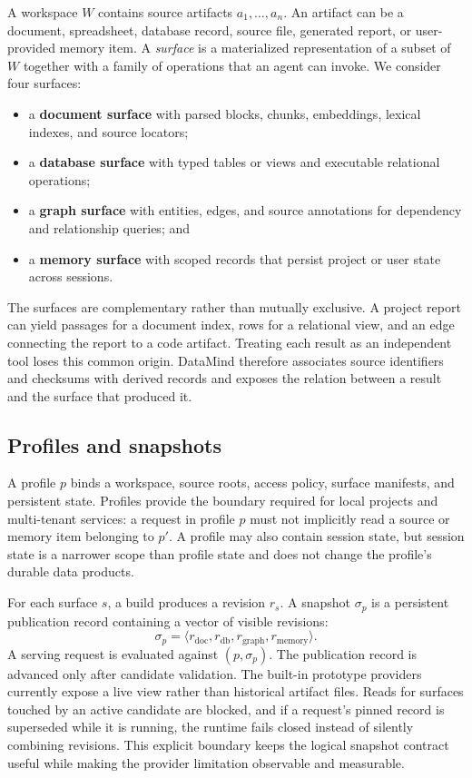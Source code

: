 A workspace $W$ contains source artifacts $a_1,\ldots,a_n$. An artifact can be
a document, spreadsheet, database record, source file, generated report, or
user-provided memory item. A \emph{surface} is a materialized representation
of a subset of $W$ together with a family of operations that an agent can
invoke. We consider four surfaces:
\begin{itemize}
  \item a \textbf{document surface} with parsed blocks, chunks, embeddings,
  lexical indexes, and source locators;
  \item a \textbf{database surface} with typed tables or views and executable
  relational operations;
  \item a \textbf{graph surface} with entities, edges, and source annotations
  for dependency and relationship queries; and
  \item a \textbf{memory surface} with scoped records that persist project or
  user state across sessions.
\end{itemize}

The surfaces are complementary rather than mutually exclusive. A project
report can yield passages for a document index, rows for a relational view,
and an edge connecting the report to a code artifact. Treating each result as
an independent tool loses this common origin. DataMind therefore associates
source identifiers and checksums with derived records and exposes the relation
between a result and the surface that produced it.

\subsection{Profiles and snapshots}
\label{sec:profile-snapshot}

A profile $p$ binds a workspace, source roots, access policy, surface
manifests, and persistent state. Profiles provide the boundary required for
local projects and multi-tenant services: a request in profile $p$ must not
implicitly read a source or memory item belonging to $p'$. A profile may also
contain session state, but session state is a narrower scope than profile state
and does not change the profile's durable data products.

For each surface $s$, a build produces a revision $r_s$. A snapshot $\sigma_p$
is a persistent publication record containing a vector of visible revisions:
\[
  \sigma_p = \langle r_{\mathrm{doc}}, r_{\mathrm{db}},
  r_{\mathrm{graph}}, r_{\mathrm{memory}} \rangle .
\]
A serving request is evaluated against $(p,\sigma_p)$. The publication record
is advanced only after candidate validation. The built-in prototype providers
currently expose a live view rather than historical artifact files. Reads for
surfaces touched by an active candidate are blocked, and if a request's pinned
record is superseded while it is running, the runtime fails closed instead of
silently combining revisions. This explicit boundary keeps
the logical snapshot contract useful while making the provider limitation
observable and measurable.

